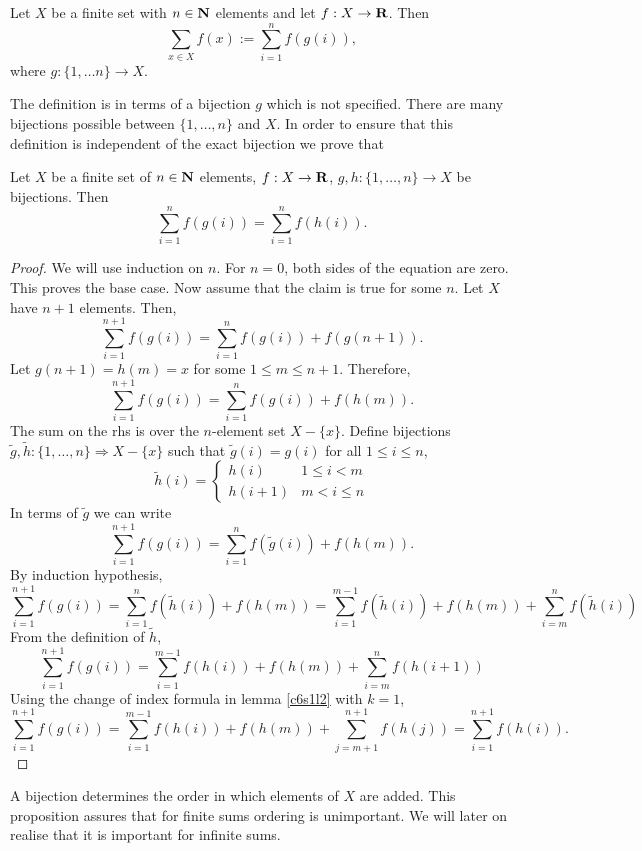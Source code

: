 \begin{defn}\label{c6s1d2}
Let $X$ be a finite set with $n \in \mathbf{N}$ elements and let $f:X \rightarrow
\mathbf{R}$. Then
\[
\sum_{x \in X} f(x) := \sum_{i=1}^nf(g(i)),
\]
where $g:\{1, \ldots n\} \rightarrow X$.
\end{defn}
The definition is in terms of a bijection $g$ which is not specified. There
are many bijections possible between $\{1, \ldots, n\}$ and $X$. In order to
ensure that this definition is independent of the exact bijection we prove
that
\begin{prop}\label{c6s1p1}
Let $X$ be a finite set of $n \in \mathbf{N}$ elements, $f:X \rightarrow \mathbf{R}$,
$g, h: \{1, \ldots, n\} \rightarrow X$ be bijections. Then
\[
\sum_{i=1}^n f(g(i)) = \sum_{i=1}^n f(h(i)).
\]
\end{prop}
\begin{proof}
We will use induction on $n$. For $n = 0$, both sides of the equation are
zero. This proves the base case. Now assume that the claim is true for some
$n$. Let $X$ have $n + 1$ elements. Then,
\[
\sum_{i=1}^{n+1} f(g(i)) = \sum_{i=1}^n f(g(i)) + f(g(n+1)).
\]
Let $g(n+1) = h(m) = x$ for some $1 \le m \le n + 1$. Therefore,
\[
\sum_{i=1}^{n+1} f(g(i)) = \sum_{i=1}^n f(g(i)) + f(h(m)).
\]
The sum on the rhs is over the $n$-element set $X - \{x\}$. Define 
bijections $\tilde{g}, \tilde{h}:\{1, \ldots, n\} \Rightarrow X - \{x\}$
such that $\tilde{g}(i) = g(i)$ for all $1 \le i \le n$,
\[
\tilde{h}(i) = \begin{cases}
 h(i) & 1 \le i < m \\
 h(i + 1) & m < i \le n
 \end{cases}
\]
In terms of $\tilde{g}$ we can write
\[
\sum_{i=1}^{n+1} f(g(i)) = \sum_{i=1}^n f(\tilde{g}(i)) + f(h(m)).
\]
By induction hypothesis,
\[
\sum_{i=1}^{n+1} f(g(i)) = \sum_{i=1}^n f(\tilde{h}(i)) + f(h(m))
= \sum_{i=1}^{m-1} f(\tilde{h}(i)) + f(h(m)) + \sum_{i=m}^nf(\tilde{h}(i))
\]
From the definition of $\tilde{h}$,
\[
\sum_{i=1}^{n+1} f(g(i)) = \sum_{i=1}^{m-1} f(h(i)) + f(h(m)) + 
\sum_{i=m}^nf(h(i+1))
\]
Using the change of index formula in lemma \ref{c6s1l2} with $k=1$,
\[
\sum_{i=1}^{n+1} f(g(i)) = \sum_{i=1}^{m-1} f(h(i)) + f(h(m)) + 
\sum_{j=m+1}^{n+1}f(h(j)) = \sum_{i=1}^{n+1}f(h(i)).
\]
\end{proof}
\begin{rem}
A bijection determines the order in which elements of $X$ are added. This
proposition assures that for finite sums ordering is unimportant. We will
later on realise that it is important for infinite sums.
\end{rem}

